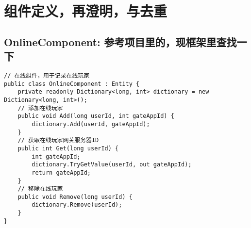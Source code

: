 \documentclass[9pt, b5paper]{article}
\begin{document}
\section{组件定义，再澄明，与去重}
\label{sec-7}
\subsection{OnlineComponent: 参考项目里的，现框架里查找一下}
\label{sec-7-1}
\begin{verbatim}
// 在线组件，用于记录在线玩家
public class OnlineComponent : Entity {
    private readonly Dictionary<long, int> dictionary = new Dictionary<long, int>();
    // 添加在线玩家
    public void Add(long userId, int gateAppId) {
        dictionary.Add(userId, gateAppId);
    }
    // 获取在线玩家网关服务器ID
    public int Get(long userId) {
        int gateAppId;
        dictionary.TryGetValue(userId, out gateAppId);
        return gateAppId;
    }
    // 移除在线玩家
    public void Remove(long userId) {
        dictionary.Remove(userId);
    }
}
\end{verbatim}
\end{document}
